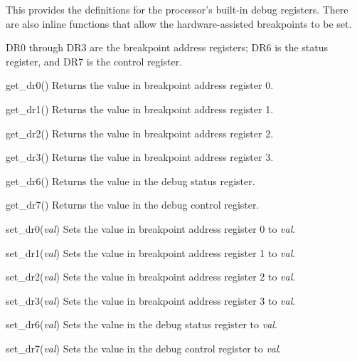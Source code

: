 \begin{apisyn}
\end{apisyn}
\begin{apidesc}
	This provides the definitions for the processor's built-in
	debug registers.  There are also inline functions that allow
	the hardware-assisted breakpoints to be set.

	DR0 through DR3 are the breakpoint address registers;
	DR6 is the status register, and DR7 is the control register.

	\begin{csymlist}
	\item[get_dr0()]
		Returns the value in breakpoint address register 0.
	\item[get_dr1()]
		Returns the value in breakpoint address register 1.
	\item[get_dr2()]
		Returns the value in breakpoint address register 2.
	\item[get_dr3()]
		Returns the value in breakpoint address register 3.
	\item[get_dr6()]
		Returns the value in the debug status register.
	\item[get_dr7()]
		Returns the value in the debug control register.

	\item[set_dr0(\emph{val})]
		Sets the value in breakpoint address register 0 to \emph{val}.
	\item[set_dr1(\emph{val})]
		Sets the value in breakpoint address register 1 to \emph{val}.
	\item[set_dr2(\emph{val})]
		Sets the value in breakpoint address register 2 to \emph{val}.
	\item[set_dr3(\emph{val})]
		Sets the value in breakpoint address register 3 to \emph{val}.
	\item[set_dr6(\emph{val})]
		Sets the value in the debug status register to \emph{val}.
	\item[set_dr7(\emph{val})]
		Sets the value in the debug control register to \emph{val}.


\end{csymlist}
\end{apidesc}
